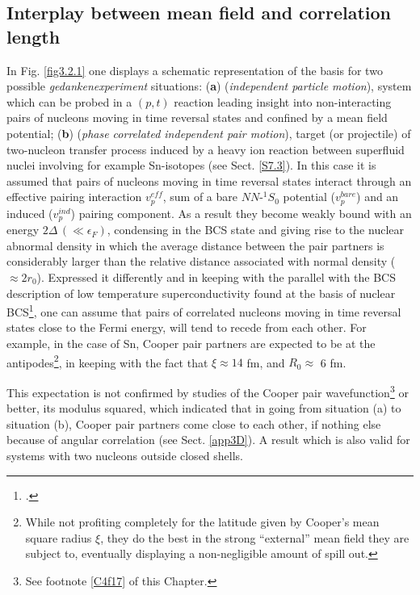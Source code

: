 \subsection{Interplay between mean field and correlation length}\label{S4.3.1}
In Fig. \ref{fig3.2.1} one displays a schematic representation of the basis for two possible \textit{gedankenexperiment} situations: (\textbf{a}) (\textit{independent particle motion}), system which can be probed in a $(p,t)$ reaction leading insight into  non-interacting pairs of nucleons moving in time reversal states and confined by a mean field potential; (\textbf{b}) (\textit{phase correlated independent pair motion}), target (or projectile) of two-nucleon transfer process induced by  a heavy ion reaction between superfluid nuclei involving for example Sn-isotopes (see Sect. \ref{S7.3}). In this case it is assumed that pairs of nucleons moving in time reversal states interact through an effective pairing interaction $v_p^{eff}$, sum of a bare $NN$-$^1S_0$ potential ($v_p^{bare}$) and an induced ($v_p^{ind}$) pairing component. As a result they become weakly bound with an energy $2\Delta\,(\ll\epsilon_F)$, condensing  in the BCS state and giving rise to the nuclear abnormal density in which the average distance between the pair partners is considerably larger than the relative distance associated with normal density ($\approx2r_0$). Expressed it differently and in keeping with the parallel  with the BCS description of low temperature superconductivity found at the basis of nuclear BCS\footnote{\cite{Bohr:58}.}, one can assume that pairs of correlated nucleons moving in time reversal states close to the Fermi energy, will tend to recede from each other. For example, in the case of Sn, Cooper pair partners are expected to be at the antipodes\footnote{While not profiting completely for the latitude given by Cooper's mean square radius $\xi$, they do the best in the strong ``external'' mean field they are subject to, eventually displaying a non-negligible amount of spill out.}, in keeping with the fact that $\xi\approx14$ fm, and $R_0\approx$ 6 fm.

This expectation is not confirmed by studies of the Cooper pair wavefunction\footnote{See footnote \ref{C4f17} of this Chapter.} or better, its modulus squared, which indicated that in going from situation (a) to situation (b), Cooper pair partners come close to each other, if nothing else because of angular correlation (see Sect. \ref{app3D}). A result which is also valid for systems with two nucleons outside closed shells. 


